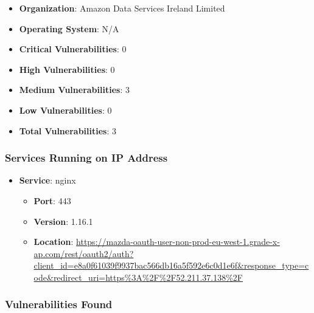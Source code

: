 \documentclass{article}
\begin{document}
\begin{itemize}
    \item \textbf{Organization}: Amazon Data Services Ireland Limited
    \item \textbf{Operating System}:  N/A 
    \item \textbf{Critical Vulnerabilities}: 0
    \item \textbf{High Vulnerabilities}: 0
    \item \textbf{Medium Vulnerabilities}: 3
    \item \textbf{Low Vulnerabilities}: 0
    \item \textbf{Total Vulnerabilities}: 3
\end{itemize}

\subsubsection*{Services Running on IP Address}

\begin{itemize}
    
        \item \textbf{Service}: nginx
        \begin{itemize}
            \item \textbf{Port}: 443
            \item \textbf{Version}:  1.16.1 
            \item \textbf{Location}: \href{ https://mazda-oauth-user-non-prod-eu-west-1.grade-x-ap.com/rest/oauth2/auth?client\_id=e8a0f61039f9937bac566db16a5f592e6c0d1e6f\&response\_type=code\&redirect\_uri=https\%3A\%2F\%2F52.211.37.138\%2F }{ https://mazda-oauth-user-non-prod-eu-west-1.grade-x-ap.com/rest/oauth2/auth?client\_id=e8a0f61039f9937bac566db16a5f592e6c0d1e6f\&response\_type=code\&redirect\_uri=https\%3A\%2F\%2F52.211.37.138\%2F }
        \end{itemize}
    
\end{itemize}


\subsubsection*{Vulnerabilities Found}
\end{document}
